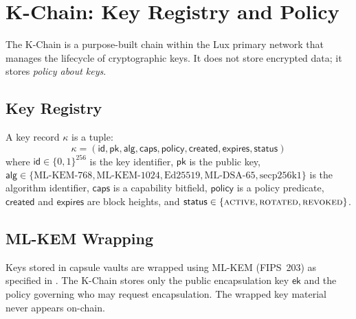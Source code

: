 

\section{K-Chain: Key Registry and Policy}
\label{sec:kchain}

The K-Chain is a purpose-built chain within the Lux primary network that manages
the lifecycle of cryptographic keys. It does not store encrypted data; it stores
\emph{policy about keys}.

\subsection{Key Registry}

\begin{definition}\label{def:key-record}
A key record $\kappa$ is a tuple:
\[
    \kappa = (\mathsf{id}, \mathsf{pk}, \mathsf{alg}, \mathsf{caps}, \mathsf{policy},
              \mathsf{created}, \mathsf{expires}, \mathsf{status})
\]
where $\mathsf{id} \in \{0,1\}^{256}$ is the key identifier, $\mathsf{pk}$ is the
public key, $\mathsf{alg} \in \{\text{ML-KEM-768}, \text{ML-KEM-1024}, \text{Ed25519},
\text{ML-DSA-65}, \text{secp256k1}\}$ is the algorithm identifier, $\mathsf{caps}$
is a capability bitfield, $\mathsf{policy}$ is a policy predicate,
$\mathsf{created}$ and $\mathsf{expires}$ are block heights, and
$\mathsf{status} \in \{\textsc{active}, \textsc{rotated}, \textsc{revoked}\}$.
\end{definition}

\subsection{ML-KEM Wrapping}

Keys stored in capsule vaults are wrapped using ML-KEM (FIPS~203) as specified in
\cite{lux-pq-crypto-suite}. The K-Chain stores only the public encapsulation key
$\mathsf{ek}$ and the policy governing who may request encapsulation. The wrapped
key material never appears on-chain.

